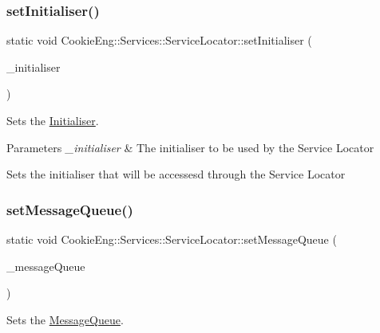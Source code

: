 \subsubsection{\texorpdfstring{set\+Initialiser()}{setInitialiser()}}
{\footnotesize\ttfamily static void Cookie\+Eng\+::\+Services\+::\+Service\+Locator\+::set\+Initialiser (\begin{DoxyParamCaption}\item[{\hyperlink{class_cookie_eng_1_1_services_1_1_initialiser}{Initialiser} $\ast$}]{\+\_\+initialiser }\end{DoxyParamCaption})\hspace{0.3cm}{\ttfamily [static]}}



Sets the \hyperlink{class_cookie_eng_1_1_services_1_1_initialiser}{Initialiser}. 


\begin{DoxyParams}{Parameters}
{\em \+\_\+initialiser} & The initialiser to be used by the Service Locator\\
\hline
\end{DoxyParams}
Sets the initialiser that will be accessesd through the Service Locator \mbox{\label{class_cookie_eng_1_1_services_1_1_service_locator_aafa67e5c104a89681d41937b4deaad9d}} 
\subsubsection{\texorpdfstring{set\+Message\+Queue()}{setMessageQueue()}}
{\footnotesize\ttfamily static void Cookie\+Eng\+::\+Services\+::\+Service\+Locator\+::set\+Message\+Queue (\begin{DoxyParamCaption}\item[{\hyperlink{class_cookie_eng_1_1_services_1_1_message_queue}{Message\+Queue} $\ast$}]{\+\_\+message\+Queue }\end{DoxyParamCaption})\hspace{0.3cm}{\ttfamily [static]}}



Sets the \hyperlink{class_cookie_eng_1_1_services_1_1_message_queue}{Message\+Queue}. 


